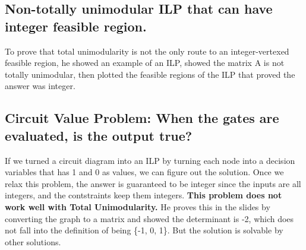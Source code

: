 \documentclass[11pt]{article}
\begin{document}
\subsection{Non-totally unimodular ILP that can have integer feasible region.}
\label{sec:orga886c66}

To prove that total unimodularity is not the only route to an integer-vertexed feasible region, he showed an example of an ILP, showed the matrix A is not totally unimodular, then plotted the feasible regions of the ILP that proved the answer was integer.

\subsection{Circuit Value Problem: When the gates are evaluated, is the output true?}
\label{sec:orga9bfa54}

If we turned a circuit diagram into an ILP by turning each node into a decision variables that has 1 and 0 as values, we can figure out the solution.
Once we relax this problem, the answer is guaranteed to be integer since the inputs are all integers, and the contstraints keep them integers.
\textbf{\textbf{This problem does not work well with Total Unimodularity.}} He proves this in the slides by converting the graph to a matrix and showed the determinant is -2, which does not fall into the definition of being \{-1, 0, 1\}. But the solution is solvable by other solutions.
\end{document}
